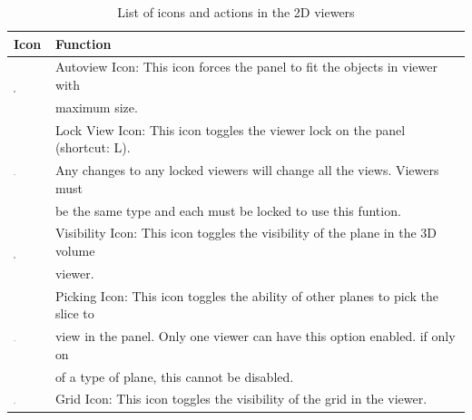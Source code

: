 \documentclass[fleqn,11pt,openany]{book}
\begin{document}
\begin{table}[h!]
\label{tab:2dicons}
\caption{List of icons and actions in the 2D viewers}
\begin{tabular}{|l|l|}
\hline
{\bf Icon} & {\bf Function}\\
\hline
\multirow{2}{*}{ \includegraphics[width=0.05\textwidth]{Seg3DBasicFunctionality_figures/AutoViewOff.png} }
& Autoview Icon: This icon forces the panel to fit the objects in viewer with \\
& maximum size.\\
\hline
\multirow{3}{*}{ \includegraphics[width=0.05\textwidth]{Seg3DBasicFunctionality_figures/LockOff.png} }
& Lock View Icon: This icon toggles the viewer lock on the panel (shortcut: L). \\ 
& Any changes to any locked viewers will change all the views.  Viewers must \\
& be the same type and each must be locked to use this funtion.\\
\hline
\multirow{2}{*}{ \includegraphics[width=0.05\textwidth]{Seg3DBasicFunctionality_figures/VisibleOff.png} }
& Visibility Icon: This icon toggles the visibility of the plane in the 3D volume \\
& viewer.\\
\hline
\multirow{3}{*}{ \includegraphics[width=0.05\textwidth]{Seg3DBasicFunctionality_figures/PickingOff.png} }
& Picking Icon: This icon toggles the ability of other planes to pick the slice to \\
& view in the panel.  Only one viewer can have this option enabled.  if only on \\
& of a type of plane, this cannot be disabled.\\
\hline
\multirow{2}{*}{ \includegraphics[width=0.05\textwidth]{Seg3DBasicFunctionality_figures/GridOff.png} }
& Grid Icon: This icon toggles the visibility of the grid in the viewer.\\

\end{tabular}
\end{table}
\end{document}
